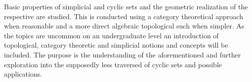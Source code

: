 \documentclass[../main.tex]{subfiles}
\begin{document}
    Basic properties of simplicial and cyclic sets and the geometric realization of the respective are studied. This is conducted using a category theoretical approach when reasonable and a more direct algebraic topological such when simpler.  As the topics are uncommon on an undergraduate level an introduction of topological, category theoretic and simplicial notions and concepts will be included. The purpose is the understanding of the aforementioned and further exploration into the supposedly less traversed of cyclic sets and possible applications. 
\end{document}
